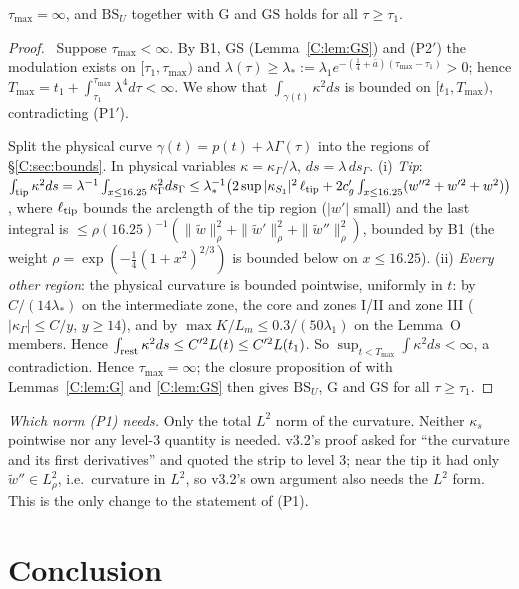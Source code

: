 \documentclass[11pt]{article}
\begin{document}
\begin{proposition}\label{C:prop:global}
$\tau_{\max}=\infty$, and $\mathrm{BS}_U$ together with $\mathrm{G}$ and $\mathrm{GS}$ holds for all $\tau\ge\tau_1$.
\end{proposition}
\begin{proof}\tP\ Suppose $\tau_{\max}<\infty$. By B1, GS (Lemma~\ref{C:lem:GS}) and (P2$'$) the modulation exists on $[\tau_1,\tau_{\max})$ and $\lambda(\tau)\ge\lambda_*:=\lambda_1e^{-(\frac14+\bar a)(\tau_{\max}-\tau_1)}>0$; hence $T_{\max}=t_1+\int_{\tau_1}^{\tau_{\max}}\lambda^4d\tau<\infty$. We show that $\int_{\gamma(t)}\kappa^2ds$ is bounded on $[t_1,T_{\max})$, contradicting (P1$'$).

Split the physical curve $\gamma(t)=p(t)+\lambda\Gamma(\tau)$ into the regions of \S\ref{C:sec:bounds}. In physical variables $\kappa=\kappa_\Gamma/\lambda$, $ds=\lambda\,ds_\Gamma$.
(i) \emph{Tip}: $\int_{\rm tip}\kappa^2ds=\lambda^{-1}\int_{x\le16.25}\kappa_\Gamma^2ds_\Gamma\le\lambda_*^{-1}\bigl(2\sup|\kappa_{S_1}|^2\,\ell_{\rm tip}+2c_g'\int_{x\le16.25}(w''^2+w'^2+w^2)\bigr)$, where $\ell_{\rm tip}$ bounds the arclength of the tip region ($|w'|$ small) and the last integral is $\le\rho(16.25)^{-1}(\|\tilde w\|_\rho^2+\|\tilde w'\|_\rho^2+\|\tilde w''\|_\rho^2)$, bounded by B1 (the weight $\rho=\exp(-\frac14(1+x^2)^{2/3})$ is bounded below on $x\le16.25$).
(ii) \emph{Every other region}: the physical curvature is bounded pointwise, uniformly in $t$: by $C/(14\lambda_*)$ on the intermediate zone, the core and zones I/II and zone III ($|\kappa_\Gamma|\le C/y$, $y\ge14$), and by $\max K/L_m\le0.3/(50\lambda_1)$ on the Lemma~O members. Hence $\int_{\rm rest}\kappa^2ds\le C'^2L(t)\le C'^2L(t_1)$.
So $\sup_{t<T_{\max}}\int\kappa^2ds<\infty$, a contradiction. Hence $\tau_{\max}=\infty$; the closure proposition of  with Lemmas~\ref{C:lem:G} and \ref{C:lem:GS} then gives $\mathrm{BS}_U$, G and GS for all $\tau\ge\tau_1$.
\end{proof}
\noindent\emph{Which norm (P1) needs.} Only the total $L^2$ norm of the curvature. Neither $\kappa_s$ pointwise nor any level-3 quantity is needed. v3.2's proof asked for ``the curvature and its first derivatives'' and quoted the strip to level 3; near the tip it had only $\tilde w''\in L^2_\rho$, i.e.\ curvature in $L^2$, so v3.2's own argument also needs the $L^2$ form. This is the only change to the statement of (P1).

\section{Conclusion}\label{C:sec:concl}
\end{document}
